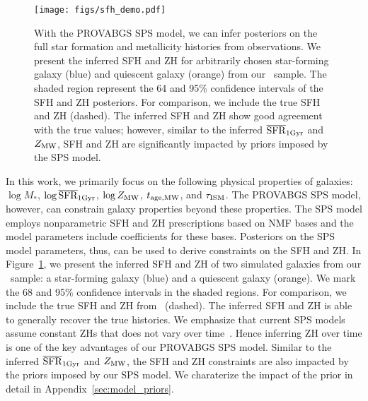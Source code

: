 \begin{figure}
\begin{center}
\texttt{[image: figs/sfh\_demo.pdf]}
    \caption{
        With the {\sc PROVABGS} SPS model, we can infer posteriors on the full
        star formation and metallicity histories from observations. 
        We present the inferred SFH and ZH for arbitrarily chosen star-forming
        galaxy (blue) and quiescent galaxy (orange) from our \lgal~sample.
        The shaded region represent the 64 and 95\% confidence intervals of the
        SFH and ZH posteriors. 
        For comparison, we include the true SFH and ZH (dashed). 
        The inferred SFH and ZH show good agreement with the true values;
        however, similar to the inferred $\overline{\rm SFR}_{\rm 1Gyr}$ and $Z_{\rm MW}$, SFH and ZH are
        significantly impacted by priors imposed by the SPS model. 
    } \label{fig:sfh_demo}
\end{center}
\end{figure}


In this work, we primarily focus on the following physical properties of
galaxies: $\log M_*$, $\log\overline{\rm SFR}_{\rm 1Gyr}$, $\log Z_{\rm MW}$, $t_{\rm age, MW}$, and $\tau_{\rm ISM}$. 
The {\sc PROVABGS} SPS model, however, can constrain galaxy properties beyond
these properties. 
The SPS model employs nonparametric SFH and ZH prescriptions based on NMF bases
and the model parameters include coefficients for these bases. 
Posteriors on the SPS model parameters, thus, can be used to derive constraints
on the SFH and ZH. 
In Figure~\ref{fig:sfh_demo}, we present the inferred SFH and ZH of two
simulated galaxies from our \lgal~sample: a star-forming galaxy (blue) and a
quiescent galaxy (orange). 
We mark the 68 and 95\% confidence intervals in the shaded regions. 
For comparison, we include the true SFH and ZH from \lgal~(dashed).  
The inferred SFH and ZH is able to generally recover the true histories. 
We emphasize that current SPS models assume constant ZHs that does not vary
over time~\citep{carnall2017, leja2019}. 
Hence inferring ZH over time is one of the key advantages of our {\sc PROVABGS}
SPS model. 
Similar to the inferred $\overline{\rm SFR}_{\rm 1Gyr}$ and $Z_{\rm MW}$, the SFH and ZH constraints are
also impacted by the priors imposed by our SPS model. 
We charaterize the impact of the prior in detail in
Appendix~\ref{sec:model_priors}.

